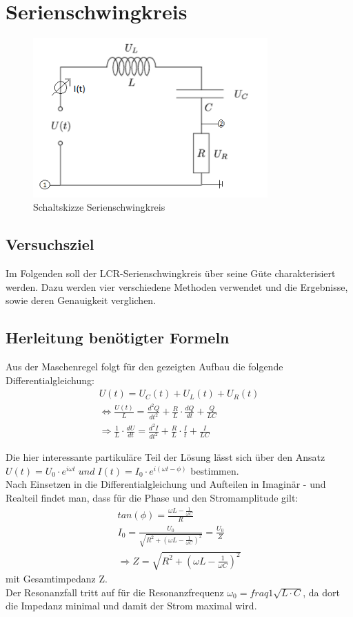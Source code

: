 \documentclass[a4paper, 11pt]{article}
\begin{document}
\newpage 
\section{Serienschwingkreis}

\begin{figure}[H]
	\centering
	\includegraphics[trim = 0mm 0mm 0mm 0mm,clip, width=9cm]{Bilder/k.png}%
	\caption[Schaltskizze Serienschwingkreis]{Schaltskizze Serienschwingkreis}%
	\label{pic:Abbildung 1}%
\end{figure}
\subsection{Versuchsziel}
Im Folgenden soll der LCR-Serienschwingkreis über seine Güte charakterisiert werden. Dazu werden vier verschiedene Methoden verwendet und die Ergebnisse, sowie deren Genauigkeit verglichen.

\subsection{Herleitung benötigter Formeln}
Aus der Maschenregel folgt für den gezeigten Aufbau die folgende Differentialgleichung:
\begin{eqnarray}
U(t) = U_C(t) + U_L(t) + U_R(t) \\
\Leftrightarrow \frac{U(t)}{L} = \frac{d^2Q}{dt^2} + \frac{R}{L} \cdot \frac{dQ}{dt} + \frac{Q}{L C} \\
\Rightarrow	\frac{1}{L} \cdot \frac{dU}{dt} = \frac{d^2I}{dt^2} + \frac{R}{L} \cdot\frac{I}{t} + \frac{I}{LC}
\end{eqnarray}

Die hier interessante partikuläre Teil der Lösung lässt sich über den Ansatz $U(t) = U_0 \cdot e^{i \omega t} \; und \; I(t) = I_0 \cdot e^{i( \omega t - \phi)}$ bestimmen.\\
Nach Einsetzen in die Differentialgleichung und Aufteilen in Imaginär - und Realteil findet man, dass für die Phase und den Stromamplitude gilt:
\begin{eqnarray}
tan(\phi) = \frac{\omega L - \frac{1}{\omega C}}{R} \\
I_0 = \frac{U_0}{\sqrt{R^2 + (\omega L - \frac{1}{\omega C})^2}} = \frac{U_0}{Z} \\
\Rightarrow Z = \sqrt{R^2 + (\omega L - \frac{1}{\omega C})^2}
\end{eqnarray}
mit Gesamtimpedanz Z. \\
Der Resonanzfall tritt auf für die Resonanzfrequenz $\omega_0 = fraq{1}{\sqrt{L \cdot C}}$, da dort die Impedanz minimal und damit der Strom maximal wird.
\end{document}
